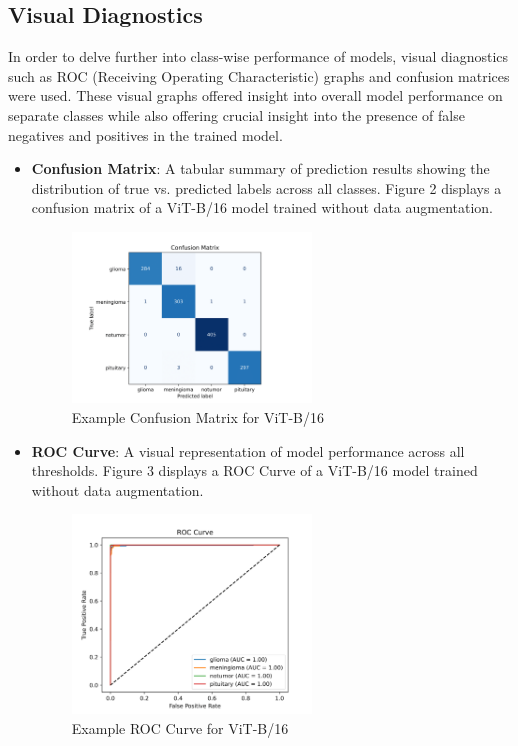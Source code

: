 \documentclass[11pt]{article}
\begin{document}
\subsection*{Visual Diagnostics}

In order to delve further into class-wise performance of models, visual diagnostics such as ROC (Receiving Operating Characteristic) graphs and confusion matrices were used. These visual graphs offered insight into overall model performance on separate classes while also offering crucial insight into the presence of false negatives and positives in the trained model.

\begin{itemize}

\item \textbf{Confusion Matrix}:
A tabular summary of prediction results showing the distribution of true vs. predicted labels across all classes. Figure 2 displays a confusion matrix of a ViT-B/16 model trained without data augmentation.
\begin{figure}[H]
\centering
\includegraphics[width=0.6\textwidth]{figures/conf_mat_v3.png}
\caption{Example Confusion Matrix for ViT-B/16}
\label{fig:conf_mat_vit16}
\end{figure}

\item \textbf{ROC Curve}:
A visual representation of model performance across all thresholds. Figure 3 displays a ROC Curve of a ViT-B/16 model trained without data augmentation.
\begin{figure}[H]
\centering
\includegraphics[width=0.6\textwidth]{figures/roc.png}
\caption{Example ROC Curve for ViT-B/16}
\label{fig:roc_vit16}
\end{figure}

\end{itemize}
\end{document}
